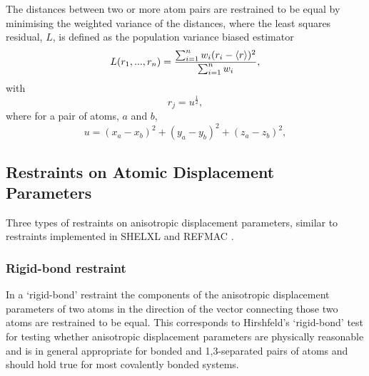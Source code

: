 \documentclass[pdf]{iucr}
\begin{document}
The distances between two or more atom pairs are restrained to be equal by minimising the weighted variance of the distances, where the least squares residual, $L$, is defined as the population variance biased estimator
\begin{equation}
\label{eqn:bond_similarity}
L(r_1,...,r_n) = \frac{\sum_{i = 1}^n {w_i(r_i - \left\langle r \right\rangle)^2}}
                      {\sum_{i = 1}^n {w_i}},
\end{equation}
with
\begin{equation*}
r_j = u^\frac{1}{2},
\end{equation*}
where for a pair of atoms, $a$ and $b$,
\begin{equation*}
u = (x_a - x_b)^2 + (y_a - y_b)^2 + (z_a - z_b)^2,
\end{equation*}



\subsection{Restraints on Atomic Displacement Parameters}

Three types of restraints on anisotropic displacement parameters, similar to restraints implemented in SHELXL \cite{Sheldrick:sc5010} and REFMAC \cite{Murshudov:li0304}.

\subsubsection{Rigid-bond restraint}

In a `rigid-bond' restraint the components of the anisotropic displacement parameters of two atoms in the direction of the vector connecting those two atoms are restrained to be equal. This corresponds to Hirshfeld's `rigid-bond' test \cite{Hirshfeld:a12865} for testing whether anisotropic displacement parameters are physically reasonable \cite{SHELX:man97} and is in general appropriate for bonded and 1,3-separated pairs of atoms and should hold true for most covalently bonded systems.
\end{document}
